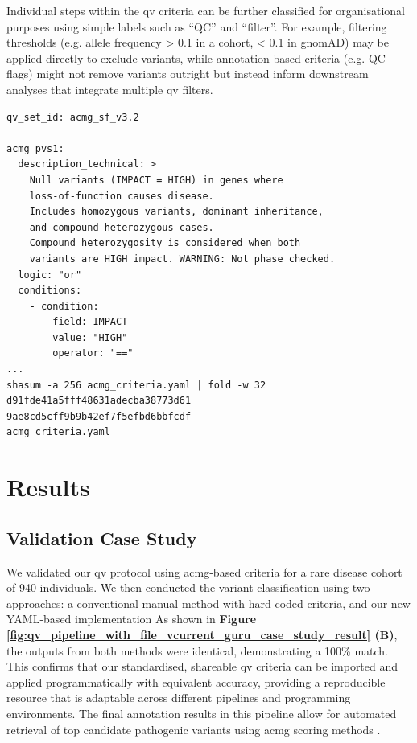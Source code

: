 Individual steps within the \ac{qv} criteria can be further classified for organisational purposes using simple labels such as ``QC'' and ``filter''. For example, filtering thresholds (e.g. allele frequency > 0.1 in a cohort, < 0.1 in gnomAD) may be applied directly to exclude variants, while annotation-based criteria (e.g. QC flags) might not remove variants outright but instead inform downstream analyses that integrate multiple \ac{qv} filters.

\begin{tcolorbox}[
    colback=white!0,
    colframe=black,
    boxrule=1pt,
    arc=1mm,
    outer arc=1mm,
    title=\textbf{\refstepcounter{myboxcounter}\label{box:acmg_criteria_yaml}Box \themyboxcounter: qv\_files/acmg\_criteria.yaml}
]
\begin{verbatim}
qv_set_id: acmg_sf_v3.2

acmg_pvs1:
  description_technical: >
    Null variants (IMPACT = HIGH) in genes where 
    loss-of-function causes disease.
    Includes homozygous variants, dominant inheritance, 
    and compound heterozygous cases.
    Compound heterozygosity is considered when both 
    variants are HIGH impact. WARNING: Not phase checked.
  logic: "or"
  conditions:
    - condition:
        field: IMPACT
        value: "HIGH"
        operator: "=="
...
shasum -a 256 acmg_criteria.yaml | fold -w 32
d91fde41a5fff48631adecba38773d61
9ae8cd5cff9b9b42ef7f5efbd6bbfcdf
acmg_criteria.yaml
\end{verbatim}
\end{tcolorbox}


\section{Results}
\subsection{Validation Case Study}

We validated our \ac{qv} protocol using \ac{acmg}-based criteria for a rare disease cohort of 940 individuals. 
We then conducted the variant classification using two approaches: a conventional manual method with hard-coded criteria, and our new YAML-based implementation
As shown in \textbf{Figure \ref{fig:qv_pipeline_with_file_vcurrent_guru_case_study_result} (B)}, 
the outputs from both methods were identical, demonstrating a 100\% match. This confirms that our standardised, shareable \ac{qv} criteria can be imported and applied programmatically with equivalent accuracy, providing a reproducible resource that is adaptable across different pipelines and programming environments.
The final annotation results in this pipeline allow for automated retrieval of top candidate pathogenic variants using \ac{acmg} scoring methods \cite{richards2015standards, tavtigian2020fitting}.


